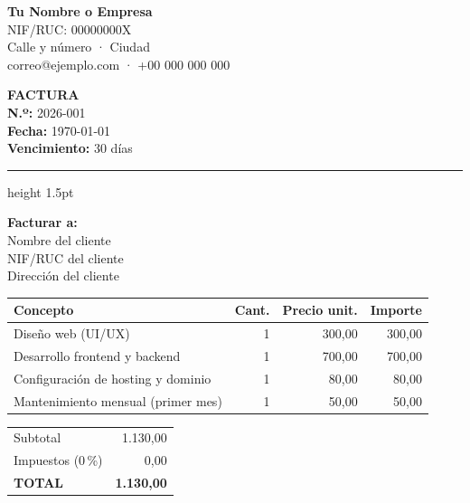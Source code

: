 \documentclass[11pt,a4paper]{article}
\begin{document}
\begin{minipage}[t]{0.58\linewidth}
  {\LARGE\bfseries\color{marca} Tu Nombre o Empresa}\\[2pt]
  NIF/RUC: 00000000X\\
  Calle y número · Ciudad\\
  correo@ejemplo.com · +00 000 000 000
\end{minipage}%
\begin{minipage}[t]{0.42\linewidth}
  \begin{flushright}
    {\Huge\bfseries\color{marca} FACTURA}\\[6pt]
    \textbf{N.º:} 2026-001\\
    \textbf{Fecha:} \today\\
    \textbf{Vencimiento:} 30 días
  \end{flushright}
\end{minipage}

\vspace{1.2em}
{\color{marca}\hrule height 1.5pt}
\vspace{1.2em}

\textbf{Facturar a:}\\
Nombre del cliente\\
NIF/RUC del cliente\\
Dirección del cliente

\vspace{1.5em}

\begin{tabular}{p{7.6cm} r r r}
  \toprule
  \textbf{Concepto} & \textbf{Cant.} & \textbf{Precio unit.} & \textbf{Importe}\\
  \midrule
  Diseño web (UI/UX)                        & 1 & 300,00 & 300,00\\
  Desarrollo frontend y backend             & 1 & 700,00 & 700,00\\
  Configuración de hosting y dominio        & 1 &  80,00 &  80,00\\
  Mantenimiento mensual (primer mes)        & 1 &  50,00 &  50,00\\
  \bottomrule
\end{tabular}

\vspace{1.5em}

\begin{flushright}
\begin{tabular}{l r}
  Subtotal          & 1.130,00\\
  Impuestos (0\,\%) & 0,00\\
  \midrule
  \textbf{TOTAL}    & \textbf{1.130,00}\\
\end{tabular}
\end{flushright}
\end{document}
